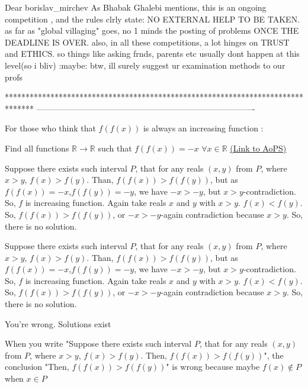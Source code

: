 \begin{mysolution}
	Dear borislav\_mirchev
As Bhabak Ghalebi mentions, this is an ongoing competition , and the rules clrly state: NO EXTERNAL HELP TO BE TAKEN.
as far as "global villaging" goes, no 1 minds the posting of problems ONCE THE DEADLINE IS OVER.
also, in all these competitions, a lot hinges on TRUST and ETHICS. so things like asking frnds, parents etc usually dont happen at this level(so i bliv) :maybe:  
btw, ill surely suggest ur examination methods to our profs 
\end{mysolution}
*******************************************************************************
-------------------------------------------------------------------------------

\begin{problem}
	For those who think that $ f(f(x))$ is always an increasing function :

Find all functions $ \mathbb{R}\rightarrow\mathbb{R}$ such that $ f(f(x)) =-x$ $ \forall x\in\mathbb{R}$
	\flushright \href{https://artofproblemsolving.com/community/c6h167038}{(Link to AoPS)}
\end{problem}



\begin{mysolution}
	Suppose there exists such interval $ P$, that for any reals $ (x,y)$ from $ P$, where $ x>y$, $ f(x)>f(y)$. Than, $ f(f(x))>f(f(y))$, but as $ f(f(x))=-x$,$ f(f(y))=-y$, we have $ -x>-y$, but $ x>y$-contradiction. So, $ f$ is increasing function. Again take reals $ x$ and $ y$ with $ x>y$. $ f(x)<f(y)$. So, $ f(f(x))>f(f(y))$, or $ -x>-y$-again contradiction because $ x>y$.
So, there is no solution.
\end{mysolution}



\begin{mysolution}
	\begin{tcolorbox}Suppose there exists such interval $ P$, that for any reals $ (x,y)$ from $ P$, where $ x > y$, $ f(x) > f(y)$. Than, $ f(f(x)) > f(f(y))$, but as $ f(f(x)) =-x$,$ f(f(y)) =-y$, we have $ -x >-y$, but $ x > y$-contradiction. So, $ f$ is increasing function. Again take reals $ x$ and $ y$ with $ x > y$. $ f(x) < f(y)$. So, $ f(f(x)) > f(f(y))$, or $ -x >-y$-again contradiction because $ x > y$.
So, there is no solution.\end{tcolorbox}

You're wrong.
Solutions exist

When you write "Suppose there exists such interval $ P$, that for any reals $ (x,y)$ from $ P$, where $ x > y$, $ f(x) > f(y)$. Then, $ f(f(x)) > f(f(y))$", the conclusion "Then, $ f(f(x)) > f(f(y))$" is wrong because maybe $ f(x)\notin P$ when $ x\in P$
\end{mysolution}



